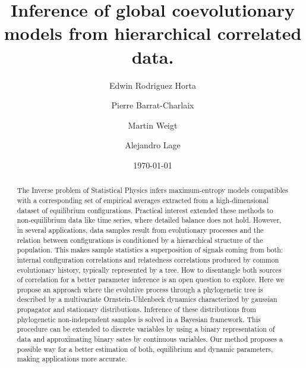 \documentclass[reprint,amsmath,amssymb,superscriptaddress,showpacs,pre]{revtex4-1}
\begin{document}
\title{Inference of global coevolutionary models from hierarchical correlated data. }

\author{Edwin Rodriguez Horta} 
\author{Pierre Barrat-Charlaix} 
\author{Martin Weigt} 
\author{Alejandro Lage} 
\date{\today}


\begin{abstract}
The Inverse problem of Statistical Physics infers maximum-entropy  models  compatibles with a corresponding set of empirical averages extracted from a high-dimensional dataset of equilibrium configurations. Practical interest extended these methods to non-equilibrium data  like  time series, where detailed balance does not hold. However, in several applications, data samples  result from evolutionary processes and the relation between configurations is conditioned by a hierarchical structure of the population. This makes sample statistics a superposition of  signals coming from both: internal configuration correlations and relatedness correlations produced by common evolutionary  history, typically represented by a tree. How to disentangle both sources of correlation for a better parameter inference is an open question to explore. Here we propose an approach  where the  evolutive process through a phylogenetic tree is described by  a  multivariate Ornstein-Uhlenbeck dynamics characterized by  gaussian propagator and stationary distributions. Inference of these distributions from  phylogenetic non-independent samples is solved in a Bayesian framework. This procedure can be  extended to discrete variables by using a binary representation of data and approximating  binary sates by continuous variables. Our method proposes a possible way for  a better estimation of both, equilibrium and dynamic parameters, making  applications more accurate.


  
\end{abstract}
\end{document}
